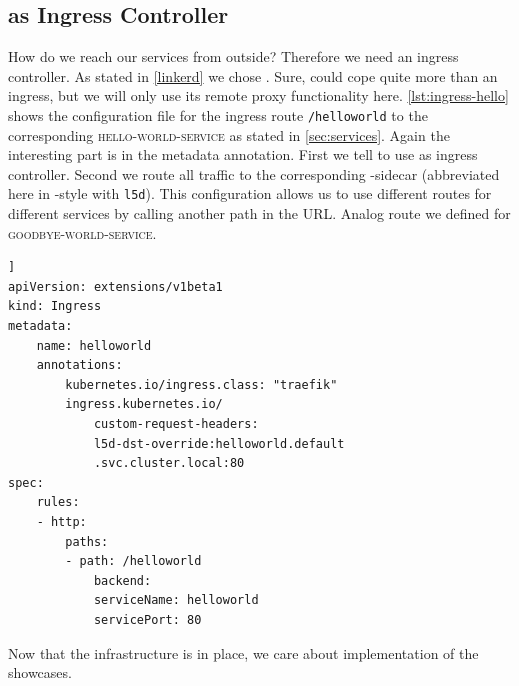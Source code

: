 \subsection{\traefik{} as Ingress Controller}

How do we reach our services from outside?
Therefore we need an ingress controller.
As stated in \autoref{linkerd} we chose \traefik{}.
Sure, \traefik{} could cope quite more than an ingress, but we will only use its remote proxy functionality here.
\autoref{lst:ingress-hello} shows the configuration file for the ingress route \lstinline|/helloworld| to the corresponding \textsc{hello-world-service} as stated in \autoref{sec:services}.
Again the interesting part is in the metadata annotation.
First we tell \kubernetes{} to use \traefik{} as ingress controller.
Second we route all traffic to the corresponding \linkerd{}-sidecar (abbreviated here in \kubernetes{}-style with \lstinline|l5d|).
This configuration allows us to use different routes for different services by calling another path in the URL.
Analog route we defined for \textsc{goodbye-world-service}.

\begin{lstlisting}[caption={YAML configuration of \lstinline|helloworld|-ingress controller.}, label={lst:ingress-hello}]]
apiVersion: extensions/v1beta1
kind: Ingress
metadata:
	name: helloworld
	annotations:
		kubernetes.io/ingress.class: "traefik"
		ingress.kubernetes.io/
			custom-request-headers: 
			l5d-dst-override:helloworld.default
			.svc.cluster.local:80
spec:
	rules:
	- http:
		paths:
		- path: /helloworld
			backend:
			serviceName: helloworld
			servicePort: 80
\end{lstlisting}

Now that the infrastructure is in place, we care about implementation of the showcases.


